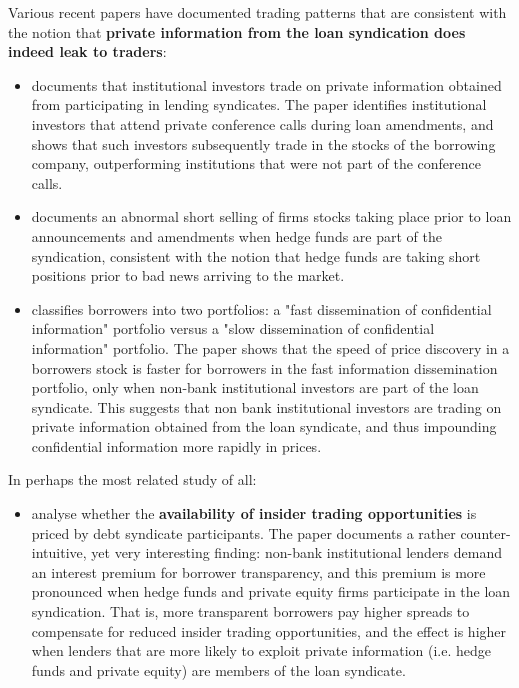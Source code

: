 \documentclass[english, 1p]{elsarticle}
\begin{document}
  Various recent papers have documented trading patterns that are consistent with the notion that \textbf{private information from the loan syndication does indeed leak to traders}:
  \begin{itemize}
   \item \cite{Ivashina2011a} documents that institutional investors trade on private information obtained from participating in lending syndicates. The paper identifies institutional investors that attend private conference calls during loan amendments, and shows that such investors subsequently trade in the stocks of the borrowing company, outperforming institutions that were not part of the conference calls. 
   \item \cite{Massoud2011} documents an abnormal short selling of firms stocks taking place prior to loan announcements and amendments when hedge funds are part of the syndication, consistent with the notion that hedge funds are taking short positions prior to bad news arriving to the market. 
   \item \cite{Bushman2010} classifies borrowers into two portfolios: a "fast dissemination of confidential information" portfolio versus a "slow dissemination of confidential information" portfolio. The paper shows that the speed of price discovery in a borrowers stock is faster for borrowers in the fast information dissemination portfolio, only when non-bank institutional investors are part of the loan syndicate. This suggests that non bank institutional investors are trading on private information obtained from the loan syndicate, and thus impounding confidential information more rapidly in prices.  
 
 \end{itemize}

In perhaps the most related study of all:
\begin{itemize}
	\item \cite{Bushman2014} analyse whether the \textbf{availability of insider trading opportunities} is priced by debt syndicate participants. The paper documents a rather counter-intuitive, yet very interesting finding: non-bank institutional lenders demand an interest premium for borrower transparency, and this premium is more pronounced when hedge funds and private equity firms participate in the loan syndication. That is, more transparent borrowers pay higher spreads to compensate for reduced insider trading opportunities, and the effect is higher when lenders that are more likely to exploit private information (i.e. hedge funds and private equity) are members of the loan syndicate. 
\end{itemize}
 
\end{document}
